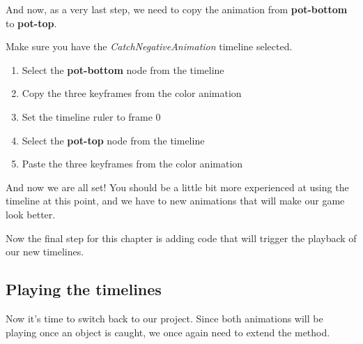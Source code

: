 And now, as a very last step, we need to copy the animation from
\textbf{pot-bottom} to \textbf{pot-top}.

\begin{leftbar}
Make sure you have the \textit{CatchNegativeAnimation} timeline selected.
\begin{enumerate}
  \item Select the \textbf{pot-bottom} node from the timeline
  \item Copy the three keyframes from the color animation
  \item Set the timeline ruler to frame 0
  \item Select the \textbf{pot-top} node from the timeline
  \item Paste the three keyframes from the color animation
\end{enumerate}
\end{leftbar}

And now we are all set! You should be a little bit more experienced at using the
timeline at this point, and we have to new animations that will make our game
look better.

Now the final step for this chapter is adding code that will trigger the
playback of our new timelines.

\subsection{Playing the timelines}
Now it's time to switch back to our \xcode{} project. Since both animations
will be playing once an object is caught, we once again need to extend the
 method.

